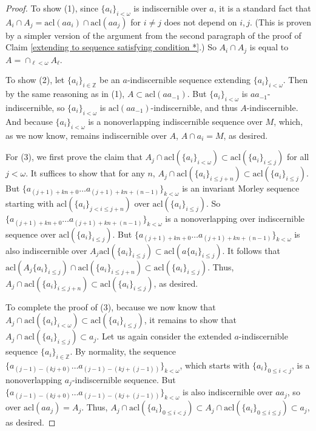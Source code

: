 \documentclass{amsart}
\theoremstyle{definition}
\theoremstyle{remark}
\numberwithin{equation}{section}
\begin{document}
\begin{proof}
     To show (1), since $\{a_{i}\}_{i < \omega}$ is indiscernible over $a$, it is a standard fact that $A_{i} \cap A_{j}= \mathrm{acl}(aa_i) \cap \mathrm{acl}(aa_j)$ for $i \neq j$ does not depend on $i, j$. (This is proven by a simpler version of the argument from the second paragraph of the proof of Claim \ref{extending to sequence satisfying condition *}.) So $A_{i} \cap A_{j}$ is equal to $A = \cap_{\ell < \omega} A_{\ell}$. 

      To show (2), let $\{a_{i}\}_{i \in \mathbb{Z}}$ be an $a$-indiscernible sequence extending $\{a_i\}_{i < \omega}$. Then by the same reasoning as in (1), $A \subset \mathrm{acl}(aa_{-1})$.  But $\{a_i\}_{i< \omega}$ is $aa_{-1}$-indiscernible, so $\{a_i\}_{i< \omega}$ is $\mathrm{acl}(aa_{-1})$-indiscernible, and thus $A$-indiscernible. And because $\{a_i\}_{i< \omega}$ is a nonoverlapping indiscernible sequence over $M$, which, as we now know, remains indiscernible over $A$, $A \cap a_{i} = M$, as desired.

      For (3), we first prove the claim that $A_{j} \cap \mathrm{acl}(\{a_{i}\}_{i < \omega}) \subset \mathrm{acl}(\{a_{i}\}_{i \leq j})$ for all $j < \omega$. It suffices to show that for any $n$, $A_{j} \cap \mathrm{acl}(\{a_{i}\}_{i \leq j+n}) \subset \mathrm{acl}(\{a_{i}\}_{i \leq j})$. But $\{a_{ (j+1) + kn+  0 }\ldots a_{(j+1)+ kn + (n-1) }\}_{k < \omega}$ is an invariant Morley sequence starting with $\mathrm{acl}(\{a_{i}\}_{j < i \leq j+n})$ over $\mathrm{acl}(\{a_{i}\}_{i \leq j})$. So $\{a_{ (j+1) + kn+  0 }\ldots a_{(j+1)+ kn + (n-1) }\}_{k < \omega}$ is a nonoverlapping over indiscernible sequence over $\mathrm{acl}(\{a_{i}\}_{i \leq j})$. But $\{a_{ (j+1) + kn+  0 }\ldots a_{(j+1)+ kn + (n-1) }\}_{k < \omega}$ is also indiscernible over $A_{j} \mathrm{acl}(\{a_{i}\}_{i \leq j}) \subset \mathrm{acl}(a\{a_{i}\}_{i \leq j})$. It follows that $\mathrm{acl}(A_{j}\{a_{i}\}_{i \leq j}) \cap \mathrm{acl}(\{a_{i}\}_{i \leq j+n}) \subset \mathrm{acl}(\{a_{i}\}_{i \leq j})$. Thus, $A_{j} \cap \mathrm{acl}(\{a_{i}\}_{i \leq j+n }) \subset \mathrm{acl}(\{a_{i}\}_{i \leq j})$, as desired.


      To complete the proof of (3), because we now know that $A_{j} \cap \mathrm{acl}(\{a_{i}\}_{i < \omega}) \subset \mathrm{acl}(\{a_{i}\}_{i \leq j})$, it remains to show that $A_{j} \cap \mathrm{acl}(\{a_{i}\}_{i \leq j}) \subset a_{j}$. Let us again consider the extended $a$-indiscernible sequence $\{a_{i}\}_{i \in \mathbb{Z}}$.  By normality, the sequence $\{a_{(j-1)-(kj+0)} \ldots a_{(j-1)-(kj+(j-1))}\}_{k < \omega}$, which starts with $\{a_{i}\}_{0 \leq i < j}$, is a nonoverlapping $a_j$-indiscernible sequence. But $\{a_{(j-1)-(kj+0)} \ldots a_{(j-1)-(kj+(j-1))}\}_{k < \omega}$ is also indiscernible over $aa_{j}$, so over $\mathrm{acl}(aa_j)=A_{j}$. Thus, $A_{j} \cap \mathrm{acl}(\{a_{i}\}_{0 \leq i < j}) \subset  A_{j} \cap\mathrm{acl}(\{a_{i}\}_{0 \leq i\leq j}) \subset   a_{j}$, as desired.
\end{proof}
\end{document}
